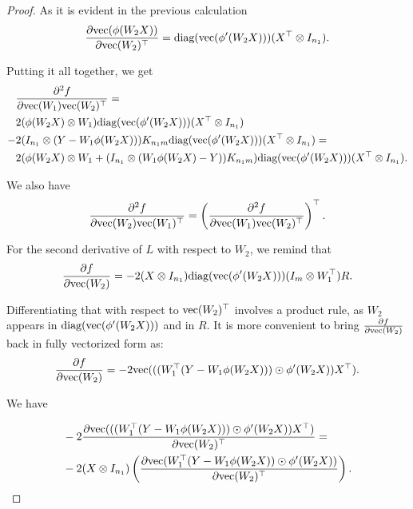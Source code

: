 \documentclass[a4paper,11pt]{article}
\newcommand{\1}{\mathbbm{1}}
\theoremstyle{plain}
\begin{document}
\begin{proof}
As it is evident in the previous calculation
\begin{equation*}
    \frac{\partial \textnormal{vec} (\phi(W_2 X)) }{\partial \textnormal{vec}(W_2)^\top} = \textnormal{diag}(\textnormal{vec}(\phi'(W_2 X))) (X^\top \otimes I_{n_1}).
\end{equation*}

Putting it all together, we get
\begin{align*}
    &\frac{\partial^2 f}{\partial \textnormal{vec}(W_1) \textnormal{vec}(W_2)^\top } = \\& 2 (\phi(W_2 X) \otimes W_1) \textnormal{diag}(\textnormal{vec}(\phi'(W_2 X))) (X^\top \otimes I_{n_1}) \\ - &2 (I_{n_1} \otimes (Y-W_1\phi(W_2 X))) K_{n_1 m} \textnormal{diag}(\textnormal{vec}(\phi'(W_2 X))) (X^\top \otimes I_{n_1}) = \\ &
    2 (\phi(W_2 X) \otimes W_1 +   (I_{n_1} \otimes (W_1\phi(W_2 X)-Y))K_{n_1 m}) \textnormal{diag}(\textnormal{vec}(\phi'(W_2 X))) (X^\top \otimes I_{n_1}).
\end{align*}

We also have
\begin{equation*}
    \frac{\partial^2 f}{\partial \textnormal{vec}(W_2) \textnormal{vec}(W_1)^\top } =\left(\frac{\partial^2 f}{\partial \textnormal{vec}(W_1) \textnormal{vec}(W_2)^\top }\right)^\top.
\end{equation*}

For the second derivative of $L$ with respect to $W_2$, we remind that
\begin{equation*}
    \frac{\partial f}{\partial \textnormal{vec}(W_2)} = -2 (X \otimes I_{n_1}) \textnormal{diag}(\textnormal{vec}(\phi'(W_2 X))) (I_m \otimes W_1^\top) R.
\end{equation*}

Differentiating that with respect to $\textnormal{vec}(W_2)^\top$ involves a product rule, as $W_2$ appears in $\textnormal{diag}(\textnormal{vec}(\phi'(W_2 X)))$ and in $R$. It is more convenient to bring $\frac{\partial f}{\partial \textnormal{vec}(W_2)}$ back in fully vectorized form as:
\begin{equation*}
   \frac{\partial f}{\partial \textnormal{vec}(W_2)} =
    -2 \textnormal{vec}(((W_1^\top (Y-W_1 \phi(W_2 X))) \odot \phi'(W_2 X) ) X^\top). 
\end{equation*}

We have

\begin{align*}
    &-2 \frac{\partial \textnormal{vec}(((W_1^\top (Y-W_1 \phi(W_2 X))) \odot \phi'(W_2 X) ) X^\top)}{\partial \text{vec}(W_2)^\top}  = \\ &  -2 (X \otimes I_{n_1}) \left( \frac{\partial\textnormal{vec}(W_1^\top(Y-W_1 \phi(W_2 X)) \odot \phi'(W_2 X))}{\partial \text{vec}(W_2)^\top} \right).
\end{align*}


\end{proof}
\end{document}

